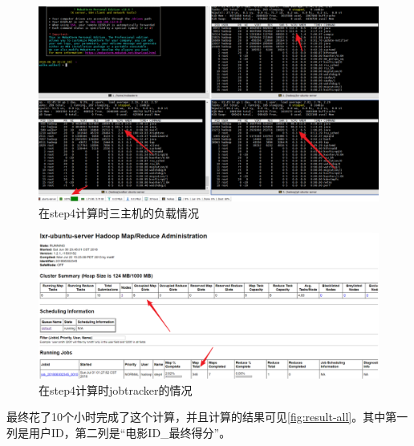 \documentclass[forprint]{myreport}
\begin{document}
\begin{figure}[htp]
  \centering
  \includegraphics[width=13cm]{"./figure/2018-07-03-14-41-38.png"}
  \caption{在step4计算时三主机的负载情况}
  \label{fig:result-step4-top}
\end{figure}


\begin{figure}[htp]
  \centering
  \includegraphics[width=13cm]{"./figure/2018-07-03-14-42-57.png"}
  \caption{在step4计算时jobtracker的情况}
  \label{fig:result-step4-jobtracker}
\end{figure}

最终花了10个小时完成了这个计算，并且计算的结果可见\autoref{fig:result-all}。其中第一列是用户ID，第二列是“电影ID\_最终得分”。
\end{document}
